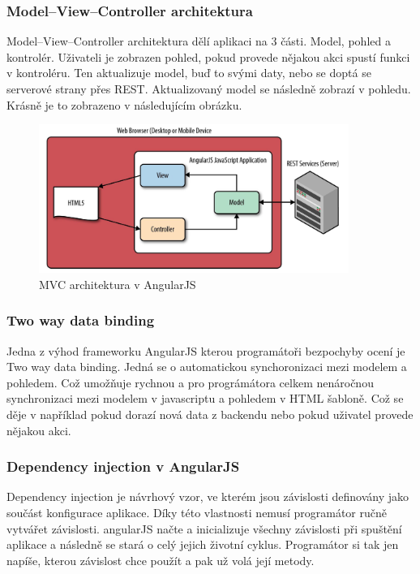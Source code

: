 \documentclass[czech,master,public,dept460,male,cpdeclaration,twoside]{diploma}
\begin{document}
\subsubsection{Model–View–Controller architektura}
Model–View–Controller architektura dělí aplikaci na 3 části. Model, pohled a kontrolér. Uživateli je zobrazen pohled, pokud provede nějakou akci spustí funkci v kontroléru. Ten aktualizuje model, buď to svými daty, nebo se doptá se serverové strany přes REST. Aktualizovaný model se následně zobrazí v pohledu. Krásně je to zobrazeno v následujícím obrázku.
\begin{figure}[H]
\centering\includegraphics[width=0.9\textwidth]{Figures/MVC.png}\caption{MVC architektura v AngularJS}
\end{figure}

\subsubsection{Two way data binding}
Jedna z výhod frameworku AngularJS kterou programátoři bezpochyby ocení je Two way data binding.   Jedná se o automatickou synchoronizaci mezi modelem a pohledem. Což umožňuje rychnou a pro prográmátora celkem nenáročnou synchronizaci mezi modelem v javascriptu a pohledem v HTML šabloně. Což se děje v například pokud dorazí nová data z backendu nebo pokud uživatel provede nějakou akci. \cite{databinding}

\subsubsection{Dependency injection v AngularJS}
Dependency injection je návrhový vzor, ve kterém jsou závislosti definovány jako součást konfigurace aplikace. Díky této vlastnosti nemusí programátor ručně vytvářet závislosti. angularJS načte a inicializuje všechny závislosti při spuštění aplikace a následně se stará o celý jejich životní cyklus. Programátor si tak jen napíše, kterou závislost chce použít a pak už volá její metody.
\end{document}
